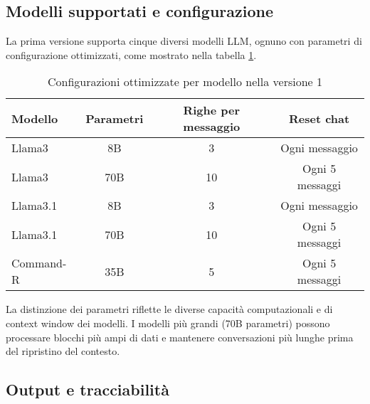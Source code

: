 \documentclass[12pt]{report}
\begin{document}
\subsection{Modelli supportati e configurazione}
\label{subsec:ver1_modelli_supportati}

La prima versione supporta cinque diversi modelli LLM, ognuno con parametri di configurazione ottimizzati, come mostrato nella tabella \ref{tab:modelli_llm_ver1}.

\begin{table}[h!]
    \centering
    \begin{tabular}{|l|c|c|c|}
        \hline
        \textbf{Modello} & \textbf{Parametri} & \textbf{Righe per messaggio} & \textbf{Reset chat} \\ \hline
        Llama3           & 8B                 & 3                            & Ogni messaggio      \\ \hline
        Llama3           & 70B                & 10                           & Ogni 5 messaggi     \\ \hline
        Llama3.1         & 8B                 & 3                            & Ogni messaggio      \\ \hline
        Llama3.1         & 70B                & 10                           & Ogni 5 messaggi     \\ \hline
        Command-R        & 35B                & 5                            & Ogni 5 messaggi     \\ \hline
    \end{tabular}
    \caption{Configurazioni ottimizzate per modello nella versione 1}
    \label{tab:modelli_llm_ver1}
\end{table}


La distinzione dei parametri riflette le diverse capacità computazionali e di context window dei modelli. I modelli più grandi (70B parametri) possono processare blocchi più ampi di dati e mantenere conversazioni più lunghe prima del ripristino del contesto.

\subsection{Output e tracciabilità}
\label{subsec:ver1_output}
\end{document}
